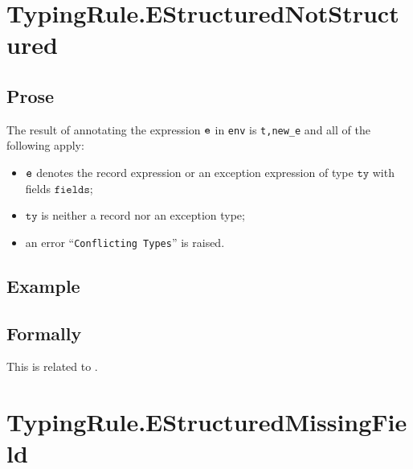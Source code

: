 \documentclass{book}
\newcommand\tty[0]{\texttt{ty}}
\newcommand\fields[0]{\texttt{fields}}
\begin{document}
\begin{itemize}

\section{TypingRule.EStructuredNotStructured \label{sec:TypingRule.EStructuredNotStructured}}

  \subsection{Prose}
  The result of annotating the expression $\texttt{e}$ in \texttt{env} is
\texttt{t,new\_e} and all of the following apply:
  \begin{itemize}
  \item $\texttt{e}$ denotes the record expression or an exception expression of type $\tty$ with fields $\fields$;
  \item $\tty$ is neither a record nor an exception type;
  \item an error ``\texttt{Conflicting Types}'' is raised.
  \end{itemize}

  \subsection{Example}



\begin{emptyformal}
    \subsection{Formally}
\end{emptyformal}


  This is related to .

\section{TypingRule.EStructuredMissingField \label{sec:TypingRule.EStructuredMissingField}}


\end{itemize}
\end{document}
